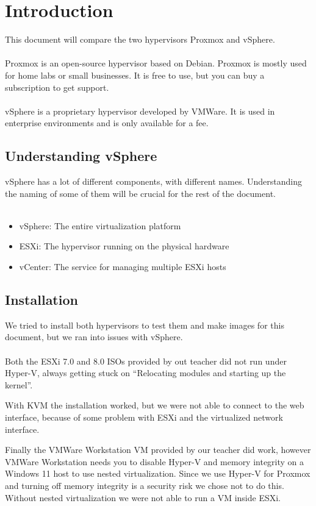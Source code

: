 \section{Introduction}
This document will compare the two hypervisors Proxmox and vSphere.
\\\\
Proxmox is an open-source hypervisor based on Debian. Proxmox is mostly used for home labs or small businesses. It is free to use, but you can buy a subscription to get support.
\\\\
vSphere is a proprietary hypervisor developed by VMWare. It is used in enterprise environments and is only available for a fee.

\subsection{Understanding vSphere}

vSphere has a lot of different components, with different names. Understanding the naming of some of them will be crucial for the rest of the document.
\\\\
\begin{itemize}
	\item vSphere: The entire virtualization platform
	\item ESXi: The hypervisor running on the physical hardware
	\item vCenter: The service for managing multiple ESXi hosts
\end{itemize}

\subsection{Installation}

We tried to install both hypervisors to test them and make images for this document, but we ran into issues with vSphere.
\\\\
Both the ESXi 7.0 and 8.0 ISOs provided by out teacher did not run under Hyper-V, always getting stuck on ``Relocating modules and starting up the kernel''.

With KVM the installation worked, but we were not able to connect to the web interface, because of some problem with ESXi and the virtualized network interface.

Finally the VMWare Workstation VM provided by our teacher did work, however VMWare Workstation needs you to disable Hyper-V and memory integrity on a Windows 11 host to use nested virtualization. Since we use Hyper-V for Proxmox and turning off memory integrity is a security risk we chose not to do this. Without nested virtualization we were not able to run a VM inside ESXi.